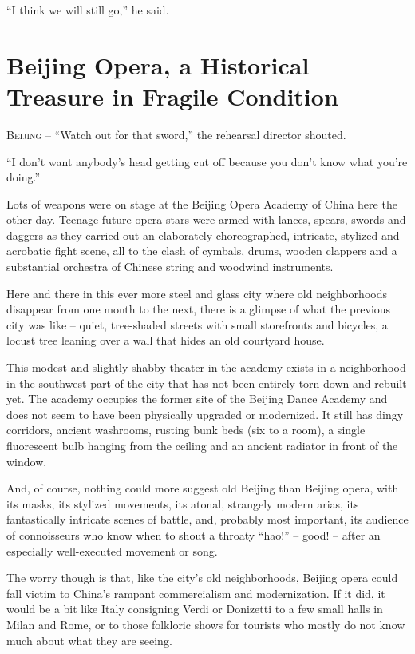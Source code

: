 ﻿\documentclass[12pt]{article}
\begin{document}
``I think we will still go,'' he said.

\pagebreak
\section{Beijing Opera, a Historical Treasure in Fragile Condition}

\lettrine{B}{eijing} -- ``Watch out for that sword,'' the rehearsal director
shouted.

``I don't want anybody's head getting cut off because you don't know what you're doing.''

Lots of weapons were on stage at the Beijing Opera Academy of China here the other day. Teenage
future opera stars were armed with lances, spears, swords and daggers as they carried out an
elaborately choreographed, intricate, stylized and acrobatic fight scene, all to the clash of
cymbals, drums, wooden clappers and a substantial orchestra of Chinese string and woodwind
instruments.

Here and there in this ever more steel and glass city where old neighborhoods disappear from one
month to the next, there is a glimpse of what the previous city was like -- quiet, tree-shaded
streets with small storefronts and bicycles, a locust tree leaning over a wall that hides an old
courtyard house.

This modest and slightly shabby theater in the academy exists in a neighborhood in the southwest
part of the city that has not been entirely torn down and rebuilt yet. The academy occupies the
former site of the Beijing Dance Academy and does not seem to have been physically upgraded or
modernized. It still has dingy corridors, ancient washrooms, rusting bunk beds (six to a room), a
single fluorescent bulb hanging from the ceiling and an ancient radiator in front of the window.

And, of course, nothing could more suggest old Beijing than Beijing opera, with its masks, its
stylized movements, its atonal, strangely modern arias, its fantastically intricate scenes of
battle, and, probably most important, its audience of connoisseurs who know when to shout a throaty
``hao!'' -- good! -- after an especially well-executed movement or song.

The worry though is that, like the city's old neighborhoods, Beijing opera could fall victim to
China's rampant commercialism and modernization. If it did, it would be a bit like Italy consigning
Verdi or Donizetti to a few small halls in Milan and Rome, or to those folkloric shows for tourists
who mostly do not know much about what they are seeing.
\end{document}

